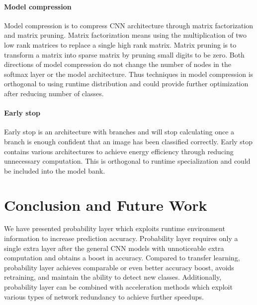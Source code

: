 \documentclass[pageno]{jpaper}
\begin{document}
\paragraph{Model compression}
Model compression is to compress CNN architecture through matrix factorization and matrix pruning. Matrix factorization \cite{jaderberg2014speeding, kim2015compression, romero2014fitnets, xue2014singular} means using the multiplication of two low rank matrices to replace a single high rank matrix. Matrix pruning \cite{chen2015compressing, han2015learning} is to transform a matrix into sparse matrix by pruning small digits to be zero. Both directions of model compression do not change the number of nodes in the softmax layer or the model architecture. Thus techniques in model compression is orthogonal to using runtime distribution and could provide further optimization after reducing number of classes. 


\paragraph{Early stop}
Early stop \cite{teerapittayanon2016branchynet, panda2016conditional} is an architecture with branches and will stop calculating once a branch is enough confident that an image has been classified correctly. Early stop contains various architectures to achieve energy efficiency through reducing unnecessary computation. This is orthogonal to runtime specialization and could be included into the model bank.

\section{Conclusion and Future Work}
We have presented probability layer which exploits runtime environment information to increase prediction accuracy. Probability layer requires only a single extra layer after the general CNN models with unnoticeable extra computation and obtains a boost in accuracy. Compared to transfer learning, probability layer achieves comparable or even better accuracy boost, avoids retraining, and maintain the ability to detect new classes. Additionally, probability layer can be combined with acceleration methods which exploit various types of network redundancy to achieve further speedups.






\end{document}
